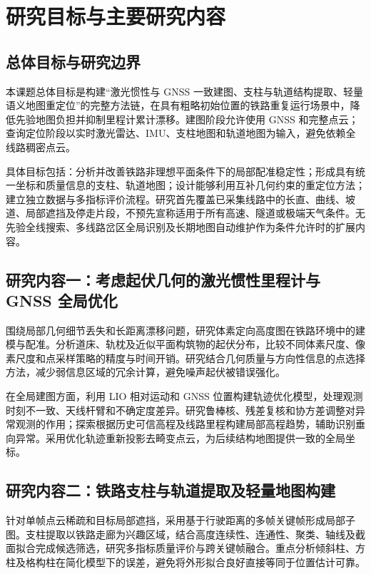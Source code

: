 \documentclass[UTF8,a4paper,12pt,fontset=fandol]{ctexart}
\begin{document}
\section{研究目标与主要研究内容}

\subsection{总体目标与研究边界}

本课题总体目标是构建“激光惯性与 GNSS 一致建图、支柱与轨道结构提取、轻量语义地图重定位”的完整方法链，在具有粗略初始位置的铁路重复运行场景中，降低先验地图负担并抑制里程计累计漂移。建图阶段允许使用 GNSS 和完整点云；查询定位阶段以实时激光雷达、IMU、支柱地图和轨道地图为输入，避免依赖全线路稠密点云。

具体目标包括：分析并改善铁路非理想平面条件下的局部配准稳定性；形成具有统一坐标和质量信息的支柱、轨道地图；设计能够利用互补几何约束的重定位方法；建立独立数据与多指标评价流程。研究首先覆盖已采集线路中的长直、曲线、坡道、局部遮挡及停走片段，不预先宣称适用于所有高速、隧道或极端天气条件。无先验全线搜索、多线路岔区全局识别及长期地图自动维护作为条件允许时的扩展内容。

\subsection{研究内容一：考虑起伏几何的激光惯性里程计与 GNSS 全局优化}

围绕局部几何细节丢失和长距离漂移问题，研究体素定向高度图在铁路环境中的建模与配准。分析道床、轨枕及近似平面构筑物的起伏分布，比较不同体素尺度、像素尺度和点采样策略的精度与时间开销。研究结合几何质量与方向性信息的点选择方法，减少弱信息区域的冗余计算，避免噪声起伏被错误强化。

在全局建图方面，利用 LIO 相对运动和 GNSS 位置构建轨迹优化模型，处理观测时刻不一致、天线杆臂和不确定度差异。研究鲁棒核、残差复核和协方差调整对异常观测的作用；探索根据历史可信高程及线路里程构建局部高程趋势，辅助识别垂向异常。采用优化轨迹重新投影去畸变点云，为后续结构地图提供一致的全局坐标。

\subsection{研究内容二：铁路支柱与轨道提取及轻量地图构建}

针对单帧点云稀疏和目标局部遮挡，采用基于行驶距离的多帧关键帧形成局部子图。支柱提取以铁路走廊为兴趣区域，结合高度连续性、连通性、聚类、轴线及截面拟合完成候选筛选，研究多指标质量评价与跨关键帧融合。重点分析倾斜柱、方柱及格构柱在简化模型下的误差，避免将外形拟合良好直接等同于位置估计可靠。
\end{document}
